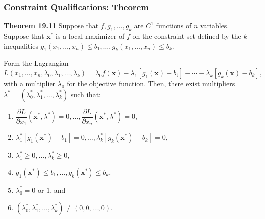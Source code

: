 \documentclass[9pt,aspectratio=169]{beamer}
\begin{document}
\begin{frame}
    \frametitle{Constraint Qualifications: Theorem}
    \begin{block}{\textbf{Theorem 19.11}}
        Suppose that $f,g_1,\ldots,g_k$ are $C^1$ functions of $n$ variables.
        Suppose that $\mathbf{x}^*$ is a local maximizer of $f$ on the
        constraint set defined by the $k$ inequalities
        $g_1(x_1,\ldots,x_n)\leq b_1,\ldots, g_k(x_1,\ldots,x_n)\leq b_k$.

        Form the Lagrangian
        \begin{equation*}
            L(x_1,\ldots,x_n,\lambda_0,\lambda_1,\ldots,\lambda_k)
            ={}\lambda_0f(\mathbf{x})-\lambda_1[g_1(\mathbf{x})-b_1]
            -\cdots -\lambda_k[g_k(\mathbf{x})-b_k],
        \end{equation*}
        with a multiplier $\lambda_0$ for the objective function. Then,
        there exist multipliers
        $\lambda^*=(\lambda_0^*,\lambda_1^*,\ldots,\lambda_k^*)$ such that:
        \begin{enumerate}
            \item[(a)] $\dfrac{\partial L}{\partial x_1}
            (\mathbf{x}^*,\lambda^*)=0,\ldots,
            \dfrac{\partial L}{\partial x_n}
            (\mathbf{x}^*,\lambda^*)=0$,
            \item[(b)] $\lambda_1^*[g_1(\mathbf{x}^*)-b_1]=0,\ldots,
            \lambda_k^*[g_k(\mathbf{x}^*)-b_k]=0$,
            \item[(c)] $\lambda_1^*\geq0,\ldots,\lambda_k^*\geq0$,
            \item[(d)] $g_1(\mathbf{x}^*)\leq b_1,\ldots,
            g_k(\mathbf{x}^*)\leq b_k$,
            \item[(e)] $\lambda_0^*=0$ or $1$, and
            \item[(f)] $(\lambda_0^*,\lambda_1^*,\ldots,\lambda_k^*)
            \neq(0,0,\ldots,0)$.
        \end{enumerate}
    \end{block}
\end{frame}

%
\end{document}
